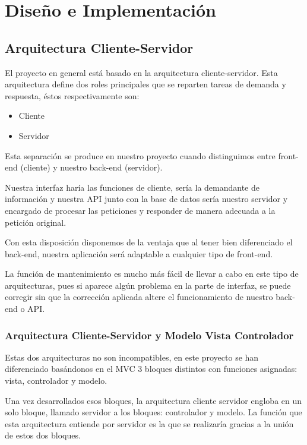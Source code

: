 \chapter{Diseño e Implementación}

\section{Arquitectura Cliente-Servidor}

El proyecto en general está basado en la arquitectura cliente-servidor\cite{clienteservidor}. Esta arquitectura define dos roles principales que se reparten tareas de demanda y respuesta, éstos respectivamente son:

\begin{itemize}
    \item Cliente
    \item Servidor
\end{itemize}

Esta separación se produce en nuestro proyecto cuando distinguimos entre front-end (cliente) y nuestro back-end (servidor).

Nuestra interfaz haría las funciones de cliente, sería la demandante de información y nuestra API junto con la base de datos sería nuestro servidor y encargado de procesar las peticiones y responder de manera adecuada a la petición original.

Con esta disposición disponemos de la ventaja que al tener bien diferenciado el back-end, nuestra aplicación será adaptable a cualquier tipo de front-end.

La función de mantenimiento es mucho más fácil de llevar a cabo en este tipo de arquitecturas, pues si aparece algún problema en la parte de interfaz, se puede corregir sin que la corrección aplicada altere el funcionamiento de nuestro back-end o API.

\subsection{Arquitectura Cliente-Servidor y Modelo Vista Controlador}

Estas dos arquitecturas no son incompatibles, en este proyecto se han diferenciado basándonos en el MVC 3 bloques distintos con funciones asignadas: vista, controlador y modelo. 

Una vez desarrollados esos bloques, la arquitectura cliente servidor engloba en un solo bloque, llamado servidor a los bloques: controlador y modelo. La función que esta arquitectura entiende por servidor es la que se realizaría gracias a la unión de estos dos bloques.

